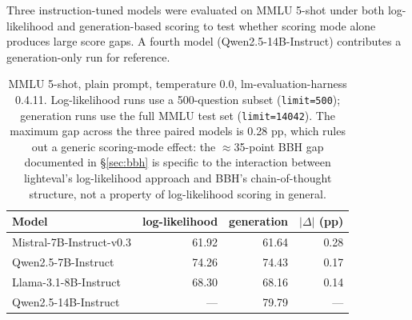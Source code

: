 \documentclass[11pt]{article}
\begin{document}
Three instruction-tuned models were evaluated on MMLU 5-shot under both
log-likelihood and generation-based scoring to test whether scoring mode
alone produces large score gaps. A fourth model (Qwen2.5-14B-Instruct)
contributes a generation-only run for reference.

\begin{table}[ht]
\centering
\small
\setlength{\tabcolsep}{4pt}
\begin{tabular}{lrrr}
\toprule
Model & log-likelihood & generation & $|\Delta|$ (pp) \\
\midrule
Mistral-7B-Instruct-v0.3   & 61.92 & 61.64 & 0.28 \\
Qwen2.5-7B-Instruct        & 74.26 & 74.43 & 0.17 \\
Llama-3.1-8B-Instruct      & 68.30 & 68.16 & 0.14 \\
Qwen2.5-14B-Instruct       &  ---  & 79.79 & ---  \\
\bottomrule
\end{tabular}
\caption{MMLU 5-shot, plain prompt, temperature 0.0, lm-evaluation-harness
0.4.11. Log-likelihood runs use a 500-question subset
(\texttt{limit=500}); generation runs use the full MMLU test set
(\texttt{limit=14042}). The maximum gap across the three paired models
is 0.28 pp, which rules out a generic scoring-mode effect: the
$\approx$35-point BBH gap documented in \S\ref{sec:bbh} is specific to
the interaction between lighteval's log-likelihood approach and BBH's
chain-of-thought structure, not a property of log-likelihood scoring in
general.}
\label{tab:e3-scoring-mode}
\end{table}
\end{document}
